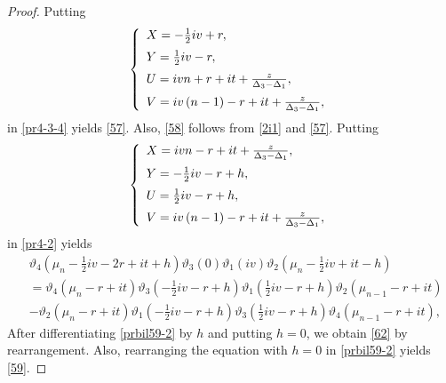 \documentclass[10pt,leqno]{amsart}
\numberwithin{equation}{section}
\begin{document}
\begin{proof}
Putting
\begin{eqnarray}\label{prbil57-1}
\left\{
\begin{array}{l}
\vspace{2mm}
X=-\frac{1}{2}iv+r,\\
\vspace{2mm}
Y=\frac{1}{2}iv-r,\\
\vspace{2mm}
U=ivn+r+it+\frac{z}{\Delta_{3}-\Delta_{1}},\\
V=iv\left(n-1\right)-r+it+\frac{z}{\Delta_{3}-\Delta_{1}},\\
\end{array}
\right.
\end{eqnarray}
in \eqref{pr4-3-4} yields \eqref{57}.
Also, \eqref{58} follows from \eqref{2i1} and \eqref{57}.
Putting
\begin{eqnarray}\label{prbil59-1}
\left\{
\begin{array}{l}
\vspace{2mm}
X=ivn-r+it+\frac{z}{\Delta_{3}-\Delta_{1}},\\
\vspace{2mm}
Y=-\frac{1}{2}iv-r+h,\\
\vspace{2mm}
U=\frac{1}{2}iv-r+h,\\
V=iv\left(n-1\right)-r+it+\frac{z}{\Delta_{3}-\Delta_{1}},\\
\end{array}
\right.
\end{eqnarray}
in \eqref{pr4-2} yields
\begin{equation}\label{prbil59-2}
\begin{split}
&\vartheta_4\left(\mu_{n}-\frac{1}{2}iv-2r+it+h\right)\vartheta_3\left(0\right)\vartheta_1\left(iv\right)\vartheta_2\left(\mu_{n}-\frac{1}{2}iv+it-h\right)\\
&=\vartheta_4\left(\mu_{n}-r+it\right)\vartheta_3\left(-\frac{1}{2}iv-r+h\right)\vartheta_1\left(\frac{1}{2}iv-r+h\right)\vartheta_2\left(\mu_{n-1}-r+it\right)\\
&-\vartheta_2\left(\mu_{n}-r+it\right)\vartheta_1\left(-\frac{1}{2}iv-r+h\right)\vartheta_3\left(\frac{1}{2}iv-r+h\right)\vartheta_4\left(\mu_{n-1}-r+it\right),
\end{split}
\end{equation}
After differentiating \eqref{prbil59-2} by $h$ and putting $h=0$, we obtain \eqref{62} by rearrangement.
Also, rearranging the equation with $h=0$ in \eqref{prbil59-2} yields \eqref{59}.

\end{proof}
\end{document}
